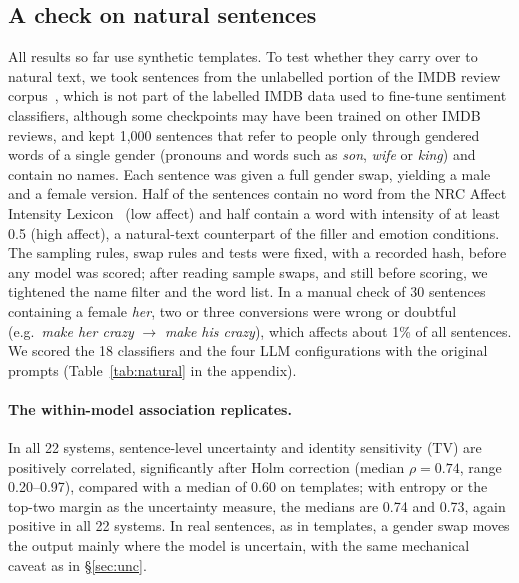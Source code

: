\documentclass[runningheads]{llncs}
\begin{document}
\subsection{A check on natural sentences}\label{sec:natural}
All results so far use synthetic templates. To test whether they carry over to
natural text, we took sentences from the unlabelled portion of the IMDB review
corpus~\cite{maas2011}, which is not part of the labelled IMDB data used to
fine-tune sentiment classifiers, although some checkpoints may have been trained
on other IMDB reviews,
and kept 1,000 sentences that refer to people only through gendered words of a
single gender (pronouns and words such as \emph{son}, \emph{wife} or
\emph{king}) and contain no names. Each sentence was given a full gender swap,
yielding a male and a female version. Half of the sentences contain no word from
the NRC Affect Intensity Lexicon~\cite{mohammad2018} (low affect) and half
contain a word with intensity of at least 0.5 (high affect), a natural-text
counterpart of the filler and emotion conditions. The sampling rules, swap rules
and tests were fixed, with a recorded hash, before any model was scored; after
reading sample swaps, and still before scoring, we tightened the name filter
and the word list. In a manual check of 30 sentences containing a female
\emph{her}, two or three conversions were wrong or doubtful (e.g.\ \emph{make
her crazy} $\to$ \emph{make his crazy}), which affects about 1\% of all
sentences. We scored the 18 classifiers and the four LLM configurations with the
original prompts (Table~\ref{tab:natural} in the appendix).

\paragraph{The within-model association replicates.} In all 22 systems,
sentence-level uncertainty and identity sensitivity (TV) are positively
correlated, significantly after Holm correction (median $\rho=0.74$, range
0.20--0.97), compared with a median of 0.60 on templates; with entropy or the
top-two margin as the uncertainty measure, the medians are 0.74 and 0.73, again
positive in all 22 systems. In real sentences, as
in templates, a gender swap moves the output mainly where the model is
uncertain, with the same mechanical caveat as in \S\ref{sec:unc}.
\end{document}
